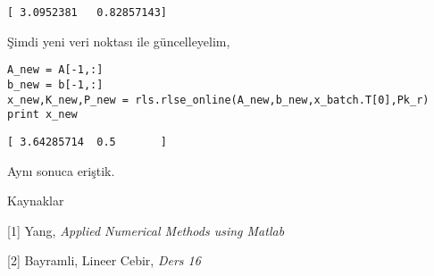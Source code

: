 \documentclass[12pt,fleqn]{article}\usepackage{../../common}
\begin{document}
\begin{verbatim}
[ 3.0952381   0.82857143]
\end{verbatim}

Şimdi yeni veri noktası ile güncelleyelim,

\begin{verbatim}
A_new = A[-1,:]
b_new = b[-1,:]
x_new,K_new,P_new = rls.rlse_online(A_new,b_new,x_batch.T[0],Pk_r)
print x_new
\end{verbatim}

\begin{verbatim}
[ 3.64285714  0.5       ]
\end{verbatim}

Aynı sonuca eriştik. 
 
Kaynaklar

[1] Yang, {\em Applied Numerical Methods using Matlab}

[2] Bayramli, Lineer Cebir, {\em Ders 16}
\end{document}
